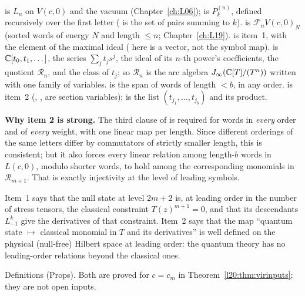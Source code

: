 \begin{dictionary}
 is $L_n$ on $V(c,0)$ and  the vacuum (Chapter~\ref{ch:L06});  is
$P^{(n)}_k$, defined recursively over the first letter ( is the set of pairs summing to $k$).
 is $\mathcal F_nV(c,0)_N$ (sorted words of energy $N$ and length $\le n$; Chapter~\ref{ch:L19}).
 is item~1, with  the element of the maximal ideal ( here is a vector, not the
symbol map).  is ${\mathbb{C}}[t_0,t_1,\dots]$,  the series $\sum_jt_js^j$,  the ideal of its
$n$-th power's coefficients,  the quotient $\mathcal R_n$, and  the class of $t_j$; so $\mathcal R_n$ is the arc
algebra $J_\infty({\mathbb{C}}[T]/(T^n))$ written with one family of variables.  is the span of words of length $<b$, in any
order.  is item~2 (, ,  are section variables);  is the list
$(t_{j_1},\dots,t_{j_b})$ and  its product.

\textbf{Why item 2 is strong.} The third clause of  is required for words in \emph{every} order and of \emph{every} weight, with one
linear map per length. Since different orderings of the same letters differ by commutators of strictly smaller length,
this is consistent; but it also forces every linear relation among length-$b$ words in $L(c,0)$, modulo shorter words, to hold
among the corresponding monomials in $\mathcal R_{m+1}$. That is exactly injectivity at the level of leading symbols.
\end{dictionary}

\begin{physics}
Item~1 says that the null state at level $2m+2$ is, at leading order in the number of stress tensors, the classical constraint
$T(z)^{m+1}=0$, and that its descendants $L_{-1}^k$ give the derivatives of that constraint. Item~2 says that the map ``quantum
state $\mapsto$ classical monomial in $T$ and its derivatives'' is well defined on the physical (null-free) Hilbert space at leading
order: the quantum theory has no leading-order relations beyond the classical ones.
\end{physics}

\begin{status}
Definitions (Props). Both are proved for $c=c_m$ in Theorem~\ref{l20:thm:virinputs}; they are not open inputs.
\end{status}

